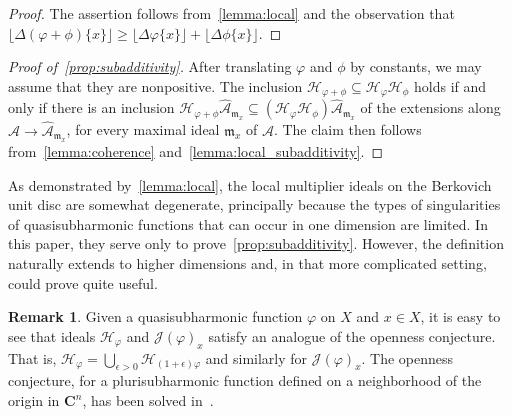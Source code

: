 \documentclass[10pt,reqno]{amsart}
\theoremstyle{plain}
\theoremstyle{definition}
\newtheorem{remark}[theorem]{Remark}
\newcommand{\C}{\mathbf{C}}
\newcommand{\frakm}{\mathfrak{m}}
\renewcommand{\H}{\mathcal{H}}
\numberwithin{equation}{section}
\newcommand{\J}{\mathcal{J}}
\begin{document}
\begin{proof}
The assertion follows from~\cref{lemma:local} and the observation that $\lfloor \Delta (\varphi + \phi)\{ x \} \rfloor \geq \lfloor \Delta \varphi \{ x \} \rfloor + \lfloor \Delta \phi \{ x \} \rfloor$.
\end{proof}

\begin{proof}[Proof of~\cref{prop:subadditivity}]
After translating $\varphi$ and $\phi$ by constants, we may assume that they are nonpositive. The inclusion $\H_{\varphi + \phi} \subseteq \H_{\varphi} \H_{\phi}$ holds if and only if there is an inclusion $\H_{\varphi + \phi} \widehat{\mathcal{A}}_{\frakm_x} \subseteq \left( \H_{\varphi} \H_{\phi} \right) \widehat{\mathcal{A}}_{\frakm_x}$ of the extensions along $\mathcal{A} \to \widehat{\mathcal{A}}_{\frakm_x}$, for every maximal ideal $\frakm_x$ of $\mathcal{A}$. The claim then follows from~\cref{lemma:coherence} and~\cref{lemma:local_subadditivity}.
\end{proof}

As demonstrated by~\cref{lemma:local}, the local multiplier ideals on the Berkovich unit disc are somewhat degenerate, principally because the types of singularities of quasisubharmonic functions that can occur in one dimension are limited. In this paper, they serve only to prove~\cref{prop:subadditivity}. However, the definition naturally extends to higher dimensions and, in that more complicated setting, could prove quite useful.

\begin{remark}
Given a quasisubharmonic function $\varphi$ on $X$ and $x \in X$, it is easy to see that ideals $\H_{\varphi}$ and $\J(\varphi)_x$ satisfy an analogue of the openness conjecture. That is, $\H_{\varphi} = \bigcup_{\epsilon > 0} \H_{(1+\epsilon)\varphi}$ and similarly for $\J(\varphi)_x$. The openness conjecture, for a plurisubharmonic function defined on a neighborhood of the origin in $\C^n$, has been solved in~\cite{bo2013}.
\end{remark}
 
\end{document}
